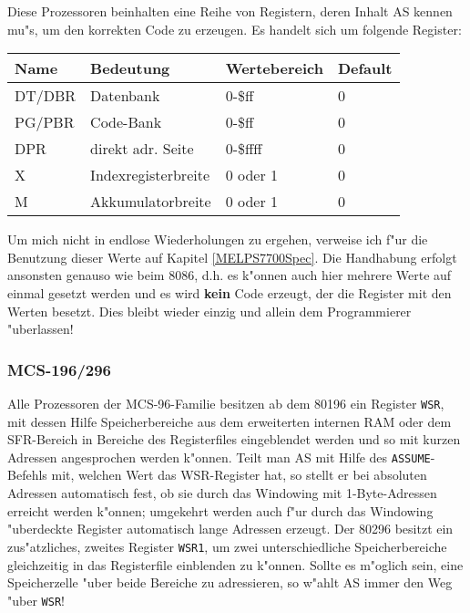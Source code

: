 \documentclass[12pt,a4paper,twoside]{report}
\newcommand{\bb}[1]{{\bf #1}}
\newcommand{\tty}[1]{{\tt #1}}
\begin{document}
Diese Prozessoren beinhalten eine Reihe von Registern, deren Inhalt AS
kennen mu"s, um den korrekten Code zu erzeugen.  Es handelt sich um folgende
Register:
\begin{center}\begin{tabular}{|l|l|l|l|}
\hline
Name  & Bedeutung           & Wertebereich & Default\\
\hline
\hline
DT/DBR & Datenbank           & 0-\$ff       & 0 \\
PG/PBR & Code-Bank           & 0-\$ff       & 0 \\
DPR   & direkt adr. Seite   & 0-\$ffff     & 0 \\
X     & Indexregisterbreite & 0 oder 1     & 0 \\
M     & Akkumulatorbreite   & 0 oder 1     & 0 \\
\hline
\end{tabular}\end{center}
\par
Um mich nicht in endlose Wiederholungen zu ergehen, verweise ich f"ur die
Benutzung dieser Werte auf Kapitel \ref{MELPS7700Spec}.  Die Handhabung
erfolgt ansonsten genauso wie beim 8086, d.h. es k"onnen auch hier mehrere
Werte auf einmal gesetzt werden und es wird \bb{kein} Code erzeugt, der
die Register mit den Werten besetzt.  Dies bleibt wieder einzig und allein
dem Programmierer "uberlassen!


\subsubsection{MCS-196/296}

Alle Prozessoren der MCS-96-Familie besitzen ab dem 80196 ein Register \tty{WSR},
mit dessen Hilfe Speicherbereiche aus dem erweiterten internen RAM
oder dem SFR-Bereich in Bereiche des Registerfiles eingeblendet werden
und so mit kurzen Adressen angesprochen werden k"onnen.  Teilt man AS
mit Hilfe des \tty{ASSUME}-Befehls mit, welchen Wert das WSR-Register
hat, so stellt er bei absoluten Adressen automatisch fest, ob  sie
durch das Windowing mit 1-Byte-Adressen erreicht werden k"onnen;
umgekehrt werden auch f"ur durch das Windowing "uberdeckte Register
automatisch lange Adressen erzeugt.  Der 80296 besitzt ein zus"atzliches,
zweites Register \tty{WSR1}, um zwei unterschiedliche Speicherbereiche
gleichzeitig in das Registerfile einblenden zu k"onnen.  Sollte
es m"oglich sein, eine Speicherzelle "uber beide Bereiche zu adressieren,
so w"ahlt AS immer den Weg "uber \tty{WSR}!
\end{document}
